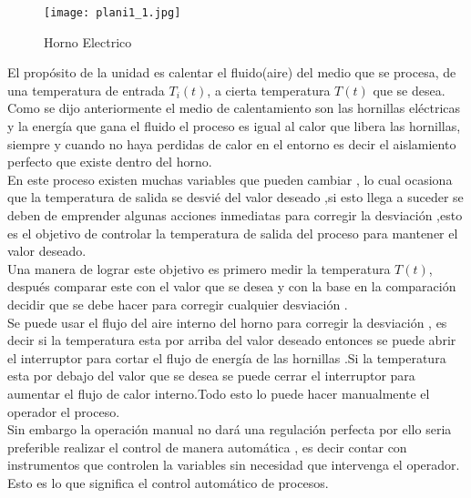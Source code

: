 \documentclass[Spanish,12pt,doublespace,german,letterpaper,dvipdfm]{article}
\begin{document}
\begin{figure}[h!]
\begin{center}
 \texttt{[image: plani1\_1.jpg]}
\end{center}
\caption{ Horno Electrico }
\end{figure}

El propósito de la unidad es calentar el fluido(aire) del medio
que se procesa, de una temperatura de entrada $T_i(t)$, a cierta
temperatura $T(t)$ que se desea.\\
Como se dijo anteriormente el medio de calentamiento son las
hornillas el\'ectricas y la energía que gana el fluido el proceso
es igual al calor que libera las hornillas, siempre y cuando no
haya perdidas de calor en el entorno es decir el aislamiento
perfecto que
existe dentro del horno.\\
En este proceso existen muchas variables que pueden cambiar , lo
cual ocasiona que la temperatura de salida se desvié del valor
deseado ,si esto llega a suceder se deben de emprender algunas
acciones inmediatas para corregir la desviaci\'on ,esto es el
objetivo de controlar la temperatura de salida del proceso  para
mantener el
valor deseado.\\
Una manera de lograr este objetivo es primero medir la temperatura
$T(t)$, después comparar este con el valor que se desea  y con la
base en la  comparaci\'on decidir que se debe hacer para corregir
cualquier desviación .\\
Se puede usar el flujo del aire interno del horno para corregir la
desviación , es decir  si la temperatura esta por arriba del valor
deseado entonces se puede abrir el interruptor  para cortar el
flujo de energía de las hornillas .Si la temperatura esta por
debajo del valor que se desea se puede cerrar el interruptor para
aumentar el flujo de calor interno.Todo esto lo puede hacer
manualmente el operador el proceso.\\
Sin embargo la operación manual no dará una regulación perfecta
por ello seria preferible  realizar el control de manera
automática , es decir contar con instrumentos que controlen la
variables sin necesidad que intervenga el operador.\\Esto es lo
que
significa el control automático de procesos.\\
\end{document}

